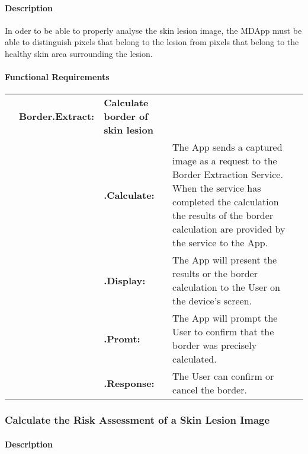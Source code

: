{            \paragraph{Description}

            In oder to be able to properly analyse the skin lesion image, the MDApp must be able to distinguish pixels that belong to the lesion from pixels that belong to the healthy skin area surrounding the lesion.

            \paragraph{Functional Requirements}

                \begin{longtable}[H]{ >{\bfseries}l >{\bfseries}l >{\bfseries}l p{9.5cm} l }

                    \hline
                    & \multicolumn{2}{>{\bfseries}l}
                    {Border.Extract:} & \textbf{Calculate border of skin lesion}  \\

                    & & .Calculate: &
                    The App sends a captured image as a request to the Border Extraction Service. When the service has completed the calculation the results of the border calculation are provided by the service to the App.
                    \\

                    & & .Display: &
                    The App will present the results or the border calculation to the User on the device’s screen.
                    \\

                    & & .Promt: & The App will prompt the User to confirm that the border was precisely calculated. \\

                    & & .Response: & The User can confirm or cancel the border. \\

                    \hline
                \end{longtable}


        \subsubsection{Calculate the Risk Assessment of a Skin Lesion Image}

            \paragraph{Description}

}
